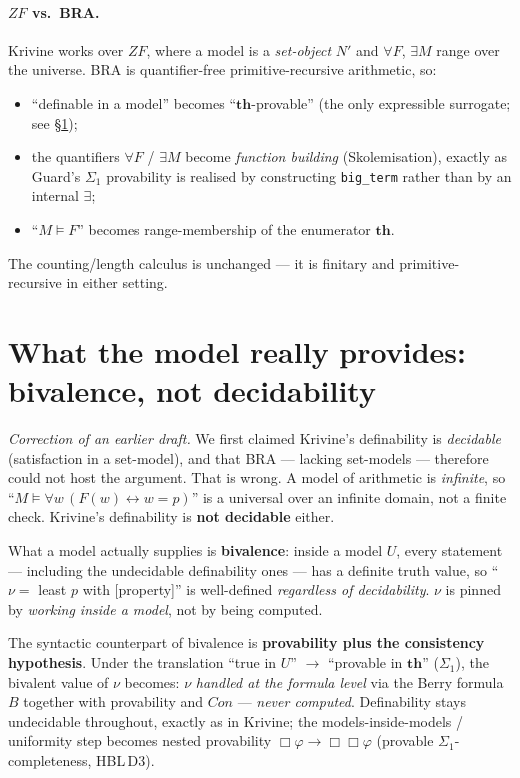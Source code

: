 \documentclass[11pt]{article}
\theoremstyle{plain}
\theoremstyle{definition}
\theoremstyle{remark}
\newcommand{\Con}{\mathit{Con}}
\newcommand{\thmT}{\mathbf{th}}
\newcommand{\sat}{\models}
\begin{document}
\paragraph{$ZF$ vs.\ BRA.}  Krivine works over $ZF$, where a model is a
\emph{set-object} $N'$ and $\forall F$, $\exists M$ range over the
universe.  BRA is quantifier-free primitive-recursive arithmetic, so:
\begin{itemize}
\item ``definable in a model'' becomes ``$\thmT$-provable'' (the only
  expressible surrogate; see {\S}\ref{sec:why-no-reloc});
\item the quantifiers $\forall F$ / $\exists M$ become \emph{function
  building} (Skolemisation), exactly as Guard's $\Sigma_1$ provability is
  realised by constructing \texttt{big\_term} rather than by an internal
  $\exists$;
\item ``$M\sat F$'' becomes range-membership of the enumerator $\thmT$.
\end{itemize}
The counting/length calculus is unchanged --- it is finitary and
primitive-recursive in either setting.

\section{What the model really provides: bivalence, not decidability}
\label{sec:why-no-reloc}

\emph{Correction of an earlier draft.}  We first claimed Krivine's
definability is \emph{decidable} (satisfaction in a set-model), and that
BRA --- lacking set-models --- therefore could not host the argument.
That is wrong.  A model of arithmetic is \emph{infinite}, so
``$M\sat\forall w\,(F(w)\leftrightarrow w=p)$'' is a universal over an
infinite domain, not a finite check.  Krivine's definability is
\textbf{not decidable} either.

What a model actually supplies is \textbf{bivalence}: inside a model $U$,
every statement --- including the undecidable definability ones --- has a
definite truth value, so ``$\nu=$ least $p$ with [property]'' is
well-defined \emph{regardless of decidability}.  $\nu$ is pinned by
\emph{working inside a model}, not by being computed.

The syntactic counterpart of bivalence is \textbf{provability plus the
consistency hypothesis}.  Under the translation ``true in $U$''
$\longrightarrow$ ``provable in $\thmT$'' ($\Sigma_1$), the bivalent value
of $\nu$ becomes: $\nu$ \emph{handled at the formula level} via the Berry
formula $B$ together with provability and $\Con$ --- \emph{never
computed}.  Definability stays undecidable throughout, exactly as in
Krivine; the models-inside-models / uniformity step becomes nested
provability $\Box\varphi\to\Box\Box\varphi$ (provable
$\Sigma_1$-completeness, HBL\,D3).
\end{document}
